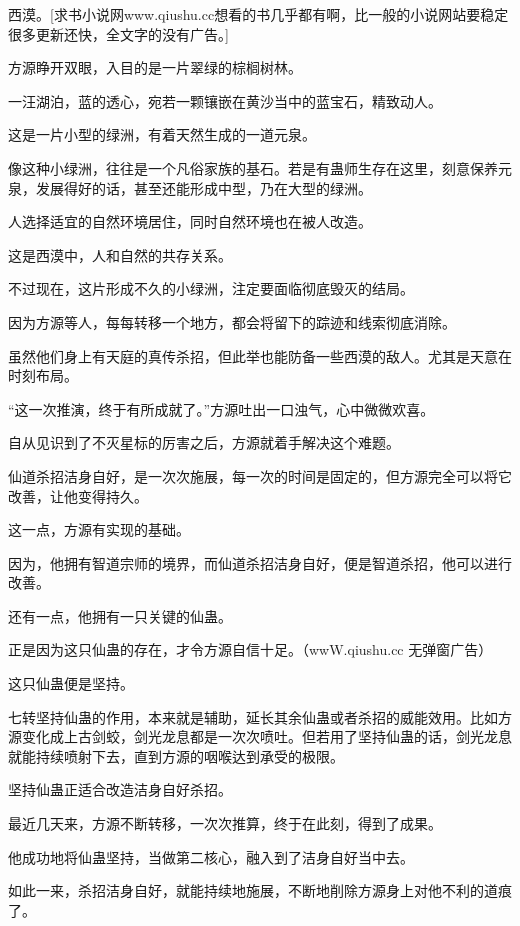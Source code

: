 
\begin{this_body}

西漠。[求书小说网www.qiushu.cc想看的书几乎都有啊，比一般的小说网站要稳定很多更新还快，全文字的没有广告。]

方源睁开双眼，入目的是一片翠绿的棕榈树林。

一汪湖泊，蓝的透心，宛若一颗镶嵌在黄沙当中的蓝宝石，精致动人。

这是一片小型的绿洲，有着天然生成的一道元泉。

像这种小绿洲，往往是一个凡俗家族的基石。若是有蛊师生存在这里，刻意保养元泉，发展得好的话，甚至还能形成中型，乃在大型的绿洲。

人选择适宜的自然环境居住，同时自然环境也在被人改造。

这是西漠中，人和自然的共存关系。

不过现在，这片形成不久的小绿洲，注定要面临彻底毁灭的结局。

因为方源等人，每每转移一个地方，都会将留下的踪迹和线索彻底消除。

虽然他们身上有天庭的真传杀招，但此举也能防备一些西漠的敌人。尤其是天意在时刻布局。

“这一次推演，终于有所成就了。”方源吐出一口浊气，心中微微欢喜。

自从见识到了不灭星标的厉害之后，方源就着手解决这个难题。

仙道杀招洁身自好，是一次次施展，每一次的时间是固定的，但方源完全可以将它改善，让他变得持久。

这一点，方源有实现的基础。

因为，他拥有智道宗师的境界，而仙道杀招洁身自好，便是智道杀招，他可以进行改善。

还有一点，他拥有一只关键的仙蛊。

正是因为这只仙蛊的存在，才令方源自信十足。（wwW.qiushu.cc 无弹窗广告）

这只仙蛊便是坚持。

七转坚持仙蛊的作用，本来就是辅助，延长其余仙蛊或者杀招的威能效用。比如方源变化成上古剑蛟，剑光龙息都是一次次喷吐。但若用了坚持仙蛊的话，剑光龙息就能持续喷射下去，直到方源的咽喉达到承受的极限。

坚持仙蛊正适合改造洁身自好杀招。

最近几天来，方源不断转移，一次次推算，终于在此刻，得到了成果。

他成功地将仙蛊坚持，当做第二核心，融入到了洁身自好当中去。

如此一来，杀招洁身自好，就能持续地施展，不断地削除方源身上对他不利的道痕了。


\end{this_body}
